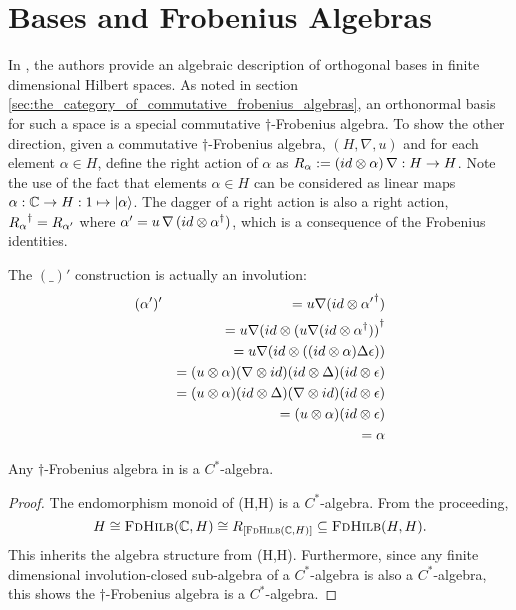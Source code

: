 


\section{Bases and Frobenius Algebras} %
\label{sec:bases_and_frobenius_algebras}
In \cite{coeckeetal08:ortho}, the authors provide an algebraic description of orthogonal bases in
finite dimensional Hilbert spaces. As noted in section
\ref{sec:the_category_of_commutative_frobenius_algebras}, an orthonormal basis for such a space is
a special commutative $\dagger$-Frobenius algebra. To show the other direction, given a commutative
$\dagger$-Frobenius algebra, $(H,\nabla,u)$ and for each element $\alpha\in H$, define the right
action of $\alpha$ as $R_{\alpha}:=(id\otimes\alpha)\, \nabla:H\to H$. Note the use of the fact that
elements $\alpha\in H$ can be considered as linear maps $\alpha:\mathbb{C} \to H:1\mapsto \left\vert{\alpha}\right\rangle$.
The dagger of a right action is also a right action, ${R_{\alpha}}^{\dagger} = R_{\alpha'}$ where
$\alpha'= u\, \nabla\, (id\otimes {\alpha}^{\dagger})$, which is a consequence of the Frobenius identities.

The $(\_)'$ construction is actually an involution:
\begin{eqnarray*}
  &(\alpha')' &= u \nabla (id \otimes {\alpha'}^{\dagger}) \\
  && = u \nabla (id \otimes {(u \nabla (id \otimes \ensuremath{{\alpha}^{\dagger}}))}^{\dagger}\\
  && = u \nabla (id \otimes ( (id \otimes \alpha) \Delta \epsilon))\\
  && = (u \otimes \alpha) (\nabla \otimes id) (id \otimes \Delta) (id \otimes  \epsilon)\\
  && = (u \otimes \alpha) (id \otimes \Delta) (\nabla \otimes id) (id \otimes  \epsilon)\\
  && = (u \otimes \alpha)  (id \otimes  \epsilon)\\
  && = \alpha
\end{eqnarray*}

\begin{lemma}\label{lemma:cstaralgebra}
  Any $\dagger$-Frobenius algebra in \fdh is a $C^{*}$-algebra.
\end{lemma}
\begin{proof}
  The endomorphism monoid of \fdh(H,H) is a $C^{*}$-algebra. From the proceeding,
  \[
    H \cong \textsc{FdHilb}(\mathbb{C},H) \cong R_{[\textsc{FdHilb}(\mathbb{C},H)]}\subseteq\textsc{FdHilb}(H,H).
  \]
  This inherits the algebra structure from \fdh(H,H). Furthermore, since any finite dimensional
  involution-closed sub-algebra of a $C^{*}$-algebra is also a $C^{*}$-algebra, this shows the
  $\dagger$-Frobenius algebra is a $C^{*}$-algebra.
\end{proof}

